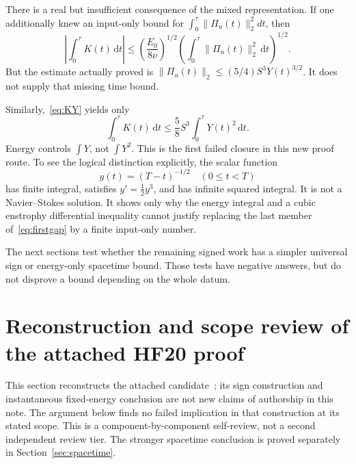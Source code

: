 \documentclass[11pt,a4paper]{article}
\theoremstyle{definition}
\newcommand{\dt}{\,\mathrm dt}
\begin{document}
There is a real but insufficient consequence of the mixed representation. If one additionally knew an input-only bound for $\int_0^\tau\|\Pi_u(t)\|_2^2dt$, then
\begin{equation}\label{eq:Pi-conditional}
 \left|\int_0^\tau K(t)\dt\right|
 \le\left(\frac{E_0}{8\nu}\right)^{1/2}
       \left(\int_0^\tau\|\Pi_u(t)\|_2^2\dt\right)^{1/2}.
\end{equation}
But the estimate actually proved is $\|\Pi_u(t)\|_2\le(5/4)S^3Y(t)^{3/2}$. It does not supply that missing time bound.

Similarly,~\eqref{eq:KY} yields only
\begin{equation}\label{eq:firstgap}
 \int_0^\tau K(t)\dt\le\frac58S^3\int_0^\tau Y(t)^2\dt.
\end{equation}
Energy controls $\int Y$, not $\int Y^2$. This is the first failed closure in this new proof route. To see the logical distinction explicitly, the scalar function
\[
 y(t)=(T-t)^{-1/2}\quad(0\le t<T)
\]
has finite integral, satisfies $y'=\tfrac12y^3$, and has infinite squared integral. It is not a Navier--Stokes solution. It shows only why the energy integral and a cubic enstrophy differential inequality cannot justify replacing the last member of~\eqref{eq:firstgap} by a finite input-only number.

The next sections test whether the remaining signed work has a simpler universal sign or energy-only spacetime bound. Those tests have negative answers, but do not disprove a bound depending on the whole datum.

\section{Reconstruction and scope review of the attached HF20 proof}\label{sec:hf20}
This section reconstructs the attached candidate~\cite{HF20}; its sign construction and instantaneous fixed-energy conclusion are not new claims of authorship in this note. The argument below finds no failed implication in that construction at its stated scope. This is a component-by-component self-review, not a second independent review tier. The stronger spacetime conclusion is proved separately in Section~\ref{sec:spacetime}.
\end{document}

